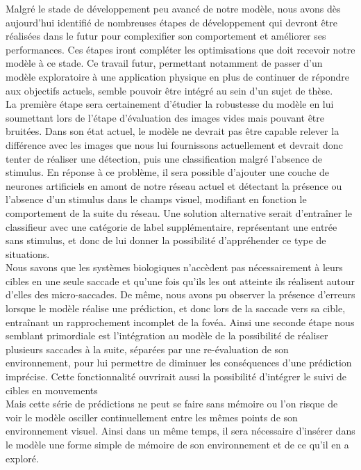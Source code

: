 
Malgré le stade de développement peu avancé de notre modèle, nous avons dès aujourd'hui identifié de nombreuses étapes de développement qui devront être réalisées dans le futur pour complexifier son comportement et améliorer ses performances. 
Ces étapes iront compléter les optimisations que doit recevoir notre modèle à ce stade.
Ce travail futur, permettant notamment de passer d'un modèle exploratoire à une application physique en plus de continuer de répondre aux objectifs actuels, semble pouvoir être intégré au sein d'un sujet de thèse.\\
La première étape sera certainement d'étudier la robustesse du modèle en lui soumettant lors de l'étape d'évaluation des images vides mais pouvant être bruitées.
Dans son état actuel, le modèle ne devrait pas être capable relever la différence avec les images que nous lui fournissons actuellement et devrait donc tenter de réaliser une détection, puis une classification malgré l'absence de stimulus.
En réponse à ce problème, il sera possible d'ajouter une couche de neurones artificiels en amont de notre réseau actuel et détectant la présence ou l'absence d'un stimulus dans le champs visuel, modifiant en fonction le comportement de la suite du réseau. 
Une solution alternative serait d'entraîner le classifieur avec une catégorie de label supplémentaire, représentant une entrée sans stimulus, et donc de lui donner la possibilité d'appréhender ce type de situations. \\
Nous savons que les systèmes biologiques n'accèdent pas nécessairement à leurs cibles en une seule saccade et qu'une fois qu'ils les ont atteinte ils réalisent autour d'elles des micro-saccades.
De même, nous avons pu observer la présence d'erreurs lorsque le modèle réalise une prédiction, et donc lors de la saccade vers sa cible, entraînant un rapprochement incomplet de la fovéa.
Ainsi une seconde étape nous semblant primordiale est l'intégration au modèle de la possibilité de réaliser plusieurs saccades à la suite, séparées par une re-évaluation de son environnement, pour lui permettre de diminuer les conséquences d'une prédiction imprécise.
Cette fonctionnalité ouvrirait aussi la possibilité d'intégrer le suivi de cibles en mouvements \autocite{Najemnik2005, Werner2014}\\
Mais cette série de prédictions ne peut se faire sans mémoire ou l'on risque de voir le modèle osciller continuellement entre les mêmes points de son environnement visuel.
Ainsi dans un même temps, il sera nécessaire d'insérer dans le modèle une forme simple de mémoire de son environnement et de ce qu'il en a exploré.
